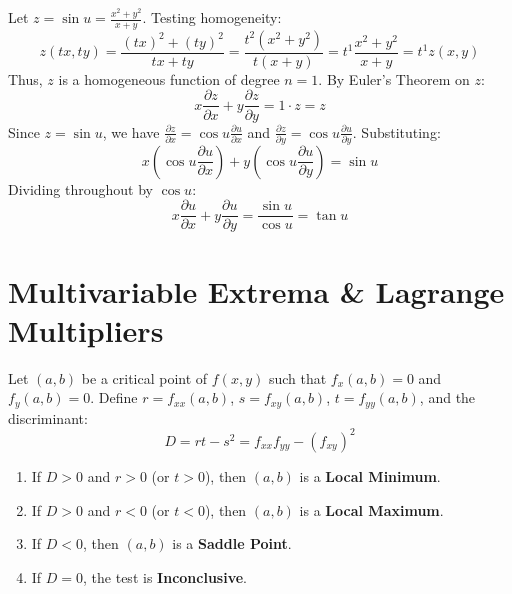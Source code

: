 \begin{solutionbox}
Let $z = \sin u = \frac{x^2 + y^2}{x + y}$.
Testing homogeneity:
\begin{equation}
z(tx, ty) = \frac{(tx)^2 + (ty)^2}{tx + ty} = \frac{t^2(x^2 + y^2)}{t(x+y)} = t^1 \frac{x^2+y^2}{x+y} = t^1 z(x,y)
\end{equation}
Thus, $z$ is a homogeneous function of degree $n = 1$.
By Euler's Theorem on $z$:
\begin{equation}
x \frac{\partial z}{\partial x} + y \frac{\partial z}{\partial y} = 1 \cdot z = z
\end{equation}
Since $z = \sin u$, we have $\frac{\partial z}{\partial x} = \cos u \frac{\partial u}{\partial x}$ and $\frac{\partial z}{\partial y} = \cos u \frac{\partial u}{\partial y}$.
Substituting:
\begin{equation}
x \left(\cos u \frac{\partial u}{\partial x}\right) + y \left(\cos u \frac{\partial u}{\partial y}\right) = \sin u
\end{equation}
Dividing throughout by $\cos u$:
\begin{equation}
x \frac{\partial u}{\partial x} + y \frac{\partial u}{\partial y} = \frac{\sin u}{\cos u} = \tan u
\end{equation}
\end{solutionbox}

\section{Multivariable Extrema \& Lagrange Multipliers}

\begin{theorem}
Let $(a,b)$ be a critical point of $f(x,y)$ such that $f_x(a,b) = 0$ and $f_y(a,b) = 0$.
Define $r = f_{xx}(a,b)$, $s = f_{xy}(a,b)$, $t = f_{yy}(a,b)$, and the discriminant:
\begin{equation}
D = r t - s^2 = f_{xx} f_{yy} - (f_{xy})^2
\end{equation}
\begin{enumerate}[leftmargin=1.5em]
    \item If $D > 0$ and $r > 0$ (or $t > 0$), then $(a,b)$ is a \textbf{Local Minimum}.
    \item If $D > 0$ and $r < 0$ (or $t < 0$), then $(a,b)$ is a \textbf{Local Maximum}.
    \item If $D < 0$, then $(a,b)$ is a \textbf{Saddle Point}.
    \item If $D = 0$, the test is \textbf{Inconclusive}.
\end{enumerate}
\end{theorem}

